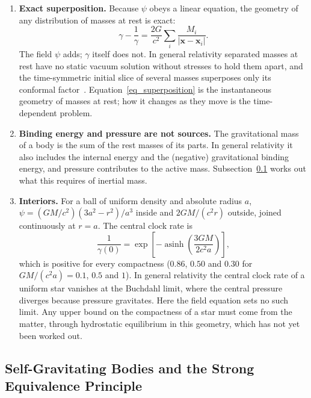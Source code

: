 \begin{enumerate}
    \item \textbf{Exact superposition.} Because $\psi$ obeys a linear equation, the geometry of any distribution of masses at rest is exact:
    \begin{equation}\label{eq_superposition}
        \gamma-\frac{1}{\gamma}=\frac{2G}{c^2}\sum_i\frac{M_i}{|\mathbf{x}-\mathbf{x}_i|}.
    \end{equation}
    The field $\psi$ adds; $\gamma$ itself does not. In general relativity separated masses at rest have no static vacuum solution without stresses to hold them apart, and the time-symmetric initial slice of several masses superposes only its conformal factor~\cite{BrillLindquist1963}. Equation~\eqref{eq_superposition} is the instantaneous geometry of masses at rest; how it changes as they move is the time-dependent problem.

    \item \textbf{Binding energy and pressure are not sources.} The gravitational mass of a body is the sum of the rest masses of its parts. In general relativity it also includes the internal energy and the (negative) gravitational binding energy, and pressure contributes to the active mass. Subsection~\ref{sec_sep} works out what this requires of inertial mass.

    \item \textbf{Interiors.} For a ball of uniform density and absolute radius $a$, $\psi=(GM/c^2)(3a^2-r^2)/a^3$ inside and $2GM/(c^2r)$ outside, joined continuously at $r=a$. The central clock rate is
    \begin{equation}\label{eq_ball_center}
        \frac{1}{\gamma(0)}=\exp\!\left[-\operatorname{asinh}\!\left(\frac{3GM}{2c^2a}\right)\right],
    \end{equation}
    which is positive for every compactness ($0.86$, $0.50$ and $0.30$ for $GM/(c^2a)=0.1$, $0.5$ and $1$). In general relativity the central clock rate of a uniform star vanishes at the Buchdahl limit, where the central pressure diverges because pressure gravitates. Here the field equation sets no such limit. Any upper bound on the compactness of a star must come from the matter, through hydrostatic equilibrium in this geometry, which has not yet been worked out.
\end{enumerate}

\subsection{Self-Gravitating Bodies and the Strong Equivalence Principle}\label{sec_sep}

